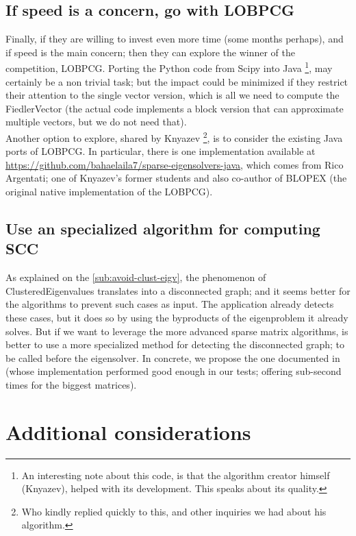 \subsection{If speed is a concern, go with \gls{LOBPCG}}

Finally, if they are willing to invest even more time (some months
perhaps),  and if speed is the
main concern; then they can explore the winner of the competition,
\gls{LOBPCG}. Porting the Python code from Scipy into Java \footnote{An
  interesting note about this code, is that the algorithm creator
  himself (Knyazev), helped with its development. This speaks about
  its quality.}, may certainly be a non trivial task; but the impact
could be minimized if they restrict their attention to the single
vector version, which is all we need to compute the \gls{FiedlerVector} (the
actual code implements a block version that can approximate multiple
vectors, but we do not need that). \\

Another option to explore, shared by Knyazev \footnote{Who kindly
  replied quickly to this, and other inquiries we had about his
  algorithm.}, is to consider the existing Java ports of
\gls{LOBPCG}. In particular, there is one implementation
available at
\url{https://github.com/bahaelaila7/sparse-eigensolvers-java}, which
comes from Rico Argentati; one of Knyazev's former students and also
co-author of BLOPEX \cite{blopex} (the original native
implementation of the \gls{LOBPCG}).

\subsection{Use an specialized algorithm for computing SCC}

As explained on the \cref{sub:avoid-clust-eigv}, the phenomenon of
\gls{ClusteredEigenvalues} translates into a disconnected graph; and
it seems better for the algorithms to prevent such cases as input. The
application already detects these cases, but it does so by using the
byproducts of the eigenproblem it already solves. But if we want to
leverage the more advanced sparse matrix algorithms, is better to use
a more specialized method for detecting the disconnected graph; to
be called before the eigensolver. In
concrete, we propose the one documented in \cite{pearce05} (whose
implementation performed good enough in our tests; offering sub-second
times for the biggest matrices). 

\section{Additional considerations}

